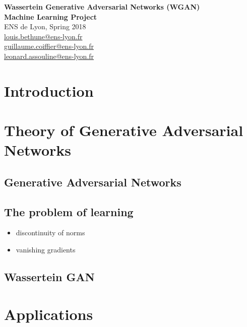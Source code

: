 \documentclass[a4paper]{report}
\begin{document}
\begin{titlepage}
\begin{center}
 {\Huge\bfseries Wassertein Generative Adversarial Networks (WGAN)\\}
 \vspace{2cm}
 {\Large \bfseries Machine Learning Project \\}
 \vspace{2cm}
 {\large ENS de Lyon, Spring 2018 \\}
 \vspace{2cm}
{\Large {} \color{black}
	\href{mailto:louis.bethune@ens-lyon.fr}{louis.bethune@ens-lyon.fr}\\
    \vspace{0.2cm}
	\href{mailto:guillaume.coiffier@ens-lyon.fr}{guillaume.coiffier@ens-lyon.fr}\\
	\vspace{0.2cm}
	\href{mailto:leonard.assouline@ens-lyon.fr}{leonard.assouline@ens-lyon.fr}\\
}
\vspace{2cm}
\vfill
\end{center}
\end{titlepage}




\setcounter{tocdepth}{1}
\tableofcontents





\chapter*{Introduction}

\lipsum

\chapter{Theory of Generative Adversarial Networks}

\section{Generative Adversarial Networks}
\lipsum[1]

\section{The problem of learning}
\begin{itemize}
    \item discontinuity of norms
    \item vanishing gradients
\end{itemize}

\section{Wassertein GAN}
\lipsum[1]

\chapter{Applications}
\lipsum


\nocite{*}


\end{document}
